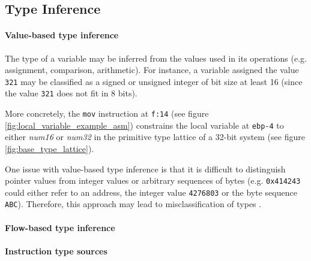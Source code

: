 
\subsection{Type Inference}


\paragraph{Value-based type inference} The type of a variable may be inferred from the values used in its operations (e.g. assignment, comparison, arithmetic). For instance, a variable assigned the value \texttt{321} may be classified as a signed or unsigned integer of bit size at least 16 (since the value \texttt{321} does not fit in 8 bits).

More concretely, the \texttt{mov} instruction at \texttt{f:14} (see figure \ref{fig:local_variable_example_asm}) constrains the local variable at \texttt{ebp-4} to either \textit{num16} or \textit{num32} in the primitive type lattice of a 32-bit system (see figure \ref{fig:base_type_lattice}).

One issue with value-based type inference is that it is difficult to distinguish pointer values from integer values or arbitrary sequences of bytes  (e.g. \texttt{0x414243} could either refer to an address, the integer value \texttt{4276803} or the byte sequence \texttt{ABC}). Therefore, this approach may lead to misclassification of types \cite{type_inference_on_executables}.


\paragraph{Flow-based type inference}

 \cite{milner_algorithmw}


\paragraph{Instruction type sources}


